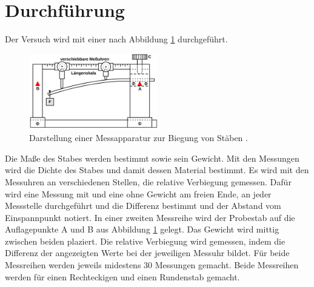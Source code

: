 \section{Durchführung}
\label{sec:Durchführung}
Der Versuch wird mit einer nach Abbildung \ref{fig:Messapparatur} durchgeführt.
\begin{figure}
  \centering
  \includegraphics[width=0.5\textwidth]{Messapparatur.png}
  \caption{Darstellung einer Messapparatur zur Biegung von Stäben \cite{sample} .}
  \label{fig:Messapparatur}
\end{figure}
 Die Maße des Stabes
werden bestimmt sowie sein Gewicht. Mit den Messungen wird die Dichte des Stabes
und damit dessen Material bestimmt. Es wird mit den Messuhren an verschiedenen
Stellen, die relative Verbiegung gemessen. Dafür wird
eine Messung mit und eine ohne Gewicht am freien Ende, an jeder Messstelle
durchgeführt und die Differenz bestimmt und der Abstand vom Einspannpunkt notiert.
In einer zweiten Messreihe wird der Probestab auf die Auflagepunkte A und B aus
Abbildung \ref{fig:Messapparatur} gelegt. Das Gewicht wird mittig zwischen beiden plaziert. Die
relative Verbiegung wird gemessen, indem die Differenz der angezeigten Werte bei der
jeweiligen Messuhr bildet. Für beide Messreihen werden jeweils midestens 30 Messungen
gemacht. Beide Messreihen werden für einen Rechteckigen und einen Rundenstab gemacht.

